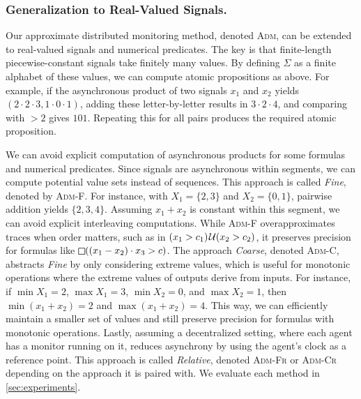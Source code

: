 \vspace{-0.5em}
\subsubsection{Generalization to Real-Valued Signals.}
Our approximate distributed monitoring method, denoted \textsc{Adm}, can be extended to real-valued signals and numerical predicates.
The key is that finite-length piecewise-constant signals take finitely many values.
By defining $\Sigma$ as a finite alphabet of these values, we can compute atomic propositions as above.
For example, if the asynchronous product of two signals $x_1$ and $x_2$ yields $(2\cdot2\cdot3, 1\cdot0\cdot1)$, adding these letter-by-letter results in $3 \cdot 2 \cdot 4$, and comparing with $> 2$ gives $101$. Repeating this for all pairs produces the required atomic proposition.

We can avoid explicit computation of asynchronous products for some formulas and numerical predicates.
Since signals are asynchronous within segments, we can compute potential value sets instead of sequences.
This approach is called \emph{Fine}, denoted by \textsc{Adm-F}.
For instance, with $X_1 = \{2,3\}$ and $X_2 = \{0,1\}$, pairwise addition yields $\{2, 3, 4\}$.
Assuming $x_1 + x_2$ is constant within this segment, we can avoid explicit interleaving computations.
While \textsc{Adm-F} overapproximates traces when order matters, such as in $(x_1 > c_1) \kern.1em\mathcal{U} (x_2 > c_2)$, it preserves precision for formulas like $\LTLalways((x_1 - x_2) \cdot x_3 > c)$.
The approach \emph{Coarse}, denoted \textsc{Adm-C}, abstracts \emph{Fine} by only considering extreme values, which is useful for monotonic operations where the extreme values of outputs derive from inputs.
For instance, if $\min X_1 = 2$, $\max X_1 = 3$, $\min X_2 = 0$, and $\max X_2 = 1$, then $\min(x_1 + x_2) = 2$ and $\max(x_1 + x_2) = 4$.
This way, we can efficiently maintain a smaller set of values and still preserve precision for formulas with monotonic operations.
Lastly, assuming a decentralized setting, where each agent has a monitor running on it, reduces asynchrony by using the agent's clock as a reference point.
This approach is called \emph{Relative}, denoted \textsc{Adm-Fr} or \textsc{Adm-Cr} depending on the approach it is paired with.
We evaluate each method in \cref{sec:experiments}.

